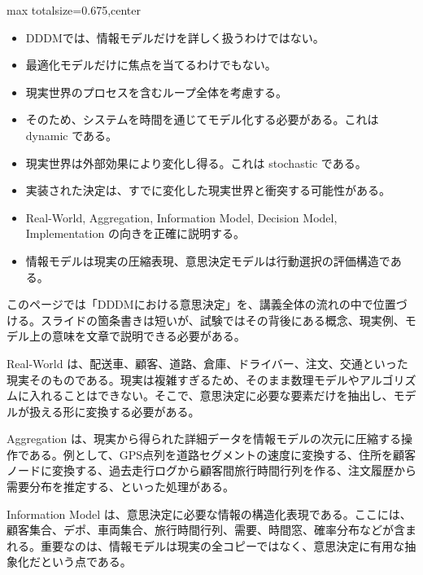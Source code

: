 \clearpage
{}
\begin{adjustbox}{max totalsize={\textwidth}{0.675\textheight},center}
\begin{minipage}{\textwidth}\scriptsize
\begin{minipage}[t]{0.485\textwidth}
\begin{itemize}
\item DDDMでは、情報モデルだけを詳しく扱うわけではない。
\item 最適化モデルだけに焦点を当てるわけでもない。
\item 現実世界のプロセスを含むループ全体を考慮する。
\item そのため、システムを時間を通じてモデル化する必要がある。これは dynamic である。
\item 現実世界は外部効果により変化し得る。これは stochastic である。
\item 実装された決定は、すでに変化した現実世界と衝突する可能性がある。
\end{itemize}
\begin{itemize}
\item Real-World, Aggregation, Information Model, Decision Model, Implementation の向きを正確に説明する。
\item 情報モデルは現実の圧縮表現、意思決定モデルは行動選択の評価構造である。
\end{itemize}
\end{minipage}\hfill
\begin{minipage}[t]{0.485\textwidth}
このページでは「DDDMにおける意思決定」を、講義全体の流れの中で位置づける。スライドの箇条書きは短いが、試験ではその背後にある概念、現実例、モデル上の意味を文章で説明できる必要がある。\par
Real-World は、配送車、顧客、道路、倉庫、ドライバー、注文、交通といった現実そのものである。現実は複雑すぎるため、そのまま数理モデルやアルゴリズムに入れることはできない。そこで、意思決定に必要な要素だけを抽出し、モデルが扱える形に変換する必要がある。\par
Aggregation は、現実から得られた詳細データを情報モデルの次元に圧縮する操作である。例として、GPS点列を道路セグメントの速度に変換する、住所を顧客ノードに変換する、過去走行ログから顧客間旅行時間行列を作る、注文履歴から需要分布を推定する、といった処理がある。\par
Information Model は、意思決定に必要な情報の構造化表現である。ここには、顧客集合、デポ、車両集合、旅行時間行列、需要、時間窓、確率分布などが含まれる。重要なのは、情報モデルは現実の全コピーではなく、意思決定に有用な抽象化だという点である。\par

\end{minipage}
\end{minipage}
\end{adjustbox}
